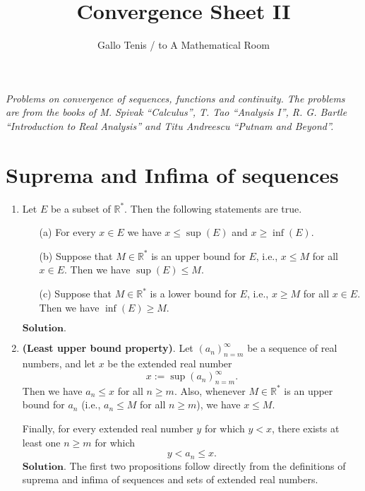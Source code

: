 \documentclass{article}
\title{Convergence Sheet II}
\author{Gallo Tenis / to A Mathematical Room}
\theoremstyle{remark}
\begin{document}
\maketitle

\begin{center}
    \textit{Problems on convergence of sequences, functions and continuity. The problems are from the books of M. Spivak ``Calculus'', T. Tao ``Analysis I'', R. G. Bartle ``Introduction to Real Analysis''
    and Titu Andreescu ``Putnam and Beyond''.}
\end{center}
\section*{Suprema and Infima of sequences}
    \begin{enumerate}
        \item Let \( E \) be a subset of \( \mathbb{R}^* \). Then the following statements are true.

        \begin{enumerate}
            \item[(a)] For every \( x \in E \) we have \( x \leq \sup(E) \) and \( x \geq \inf(E) \).
        
            \item[(b)] Suppose that \( M \in \mathbb{R}^* \) is an upper bound for \( E \), i.e., \( x \leq M \) for all \( x \in E \). Then we have \(\sup(E) \leq M\).
        
            \item[(c)] Suppose that \( M \in \mathbb{R}^* \) is a lower bound for \( E \), i.e., \( x \geq M \) for all \( x \in E \). Then we have \(\inf(E) \geq M\).
        \end{enumerate}
        $\textbf{Solution.}$


        \item \textbf{(Least upper bound property)}. Let
        \( (a_n)_{n=m}^{\infty} \) be a sequence of real numbers, and let
        \( x \) be the extended real number
        \[
        x := \sup (a_n)_{n=m}^{\infty}.
        \]
        Then we have \( a_n \leq x \) for all \( n \geq m \). Also,
        whenever \( M \in \mathbb{R}^* \) is an upper bound for \( a_n \)
        (i.e., \( a_n \leq M \) for all \( n \geq m \)), we have \( x \leq M \).
        
        Finally, for every extended real number \( y \) for which \( y < x \),
        there exists at least one \( n \geq m \) for which
        \[
        y < a_n \leq x.
        \]
        $\textbf{Solution.}$
        The first two propositions follow directly from the definitions of suprema and infima of sequences and sets 
        of extended real numbers.


\end{enumerate}
\end{document}
